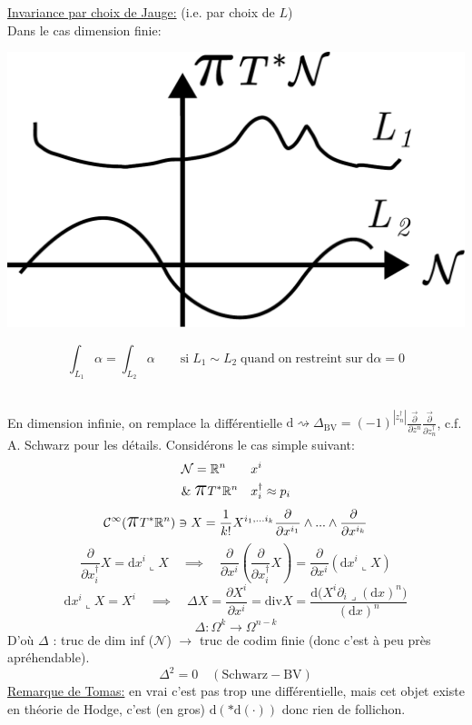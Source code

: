 \documentclass[a4paper,11pt]{article}
\renewcommand{\d}{{\mathrm{d}}}
\newcommand{\dr}[2]{\frac{\partial {#1}}{\partial{#2}}}
\newcommand{\ppi}{{\mathlarger{\mathlarger{\mathlarger{\pi}}}}}
\begin{document}
\noindent\underline{Invariance par choix de Jauge:} (i.e. par choix de $L$)\\
Dans le cas dimension finie:\\

\begin{minipage}{.15\textwidth}
	\includegraphics[width=\textwidth]{Drawings/Draw_10.pdf}
\end{minipage}
\begin{minipage}{.85\textwidth}
	$$\int_{L_1} \alpha = \int_{L_2} \alpha \quad \quad \mathrm{si}\; L_1 \sim L_2 \;\mathrm{quand}\;\mathrm{on}\;\mathrm{restreint}\;\mathrm{sur}\; \d\alpha=0$$
\end{minipage}\\

En dimension infinie, on remplace la différentielle $\d  \rightsquigarrow \Delta_\mathrm{BV} = (-1)^{|z^\dag_n|} \frac{\vec\partial}{\partial z^n}\frac{\vec\partial}{\partial z^\dag_n}$, c.f. A. Schwarz pour les détails. Considérons le cas simple suivant:
\begin{align*}
&\mathcal{N} = \mathbb{R}^n && x^i\\
&\& \; \ppi T^*\mathbb{R}^n && x_i^\dag \approx p_i
\end{align*}
$$\mathcal{C}^\infty(\ppi T^*\mathbb{R}^n) \ni X = \frac 1{k!} X^{i_1, ... i_k} \dr{}{x^{i_1}}\wedge ...\wedge \dr{}{x^{i_k}}$$
$$\dr{}{x^\dag_i} X = \d x^i \llcorner X \quad \implies\quad \dr{}{x^i} \left(\dr{}{x^\dag_i} X\right) = \dr{}{x^i}\left(\d x^i \llcorner X\right)$$
$$\d x^i \llcorner X = X^i \quad \implies \quad \Delta X = \dr{X^i}{x^i} = \mathrm{div} X = \frac{\d \Big( X^i \partial_i \lrcorner (\d x)^n\Big)}{(\d x)^n}$$
$$\Delta : \Omega^k \longrightarrow \Omega^{n-k}$$
D'où $\Delta$ : truc de dim inf ($\mathcal{N}$) $\longrightarrow$ truc de codim finie (donc c'est à peu près apréhendable).
$$\Delta^2 = 0 \quad (\mathrm{Schwarz} - \mathrm{BV})$$
\underline{Remarque de Tomas:} en vrai c'est pas trop une différentielle, mais cet objet existe en théorie de Hodge, c'est (en gros) $\d(*\d(\cdot))$ donc rien de follichon.\\
\end{document}
